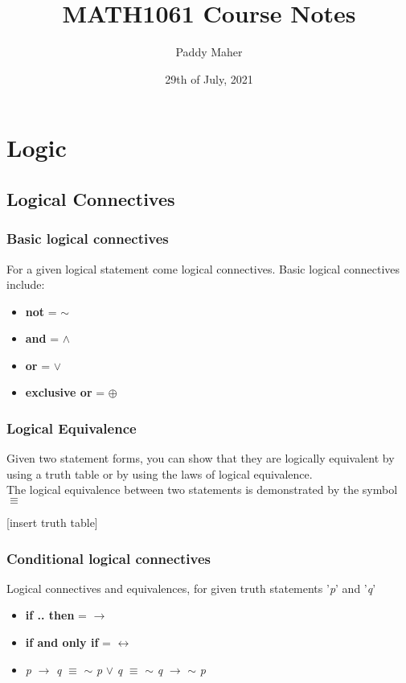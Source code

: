 \documentclass{article}
\title{MATH1061 Course Notes}
\author{Paddy Maher}
\date{29th of July, 2021}
\begin{document}
\maketitle
\newpage

\section{Logic}
\subsection{Logical Connectives}
\subsubsection{Basic logical connectives}
For a given logical statement come logical connectives. Basic logical connectives include:
\begin{itemize}
\item \textbf{not} = $\sim$
\item \textbf{and} = $\wedge$
\item \textbf{or} = $\lor$
\item \textbf{exclusive or} = $\oplus$
\end{itemize}

\subsubsection{Logical Equivalence}
Given two statement forms, you can show that they are logically equivalent by using a truth table or by using 
the laws of logical equivalence. \\
The logical equivalence between two statements is demonstrated by the symbol $\equiv$

[insert truth table]

\subsubsection{Conditional logical connectives}
Logical connectives and equivalences, for given truth statements '\textit{p}' and '\textit{q}'
\begin{itemize}
\item \textbf{if .. then} = $\rightarrow$
\item \textbf{if and only if} = $\leftrightarrow$
\item \textit{p} $\rightarrow$ \textit{q} $\equiv$ 
$\sim$ \textit{p} $\lor$ \textit{q} $\equiv$ 
$\sim$ \textit{q} $\rightarrow$ $\sim$ \textit{p}
\end{itemize}
\end{document}
